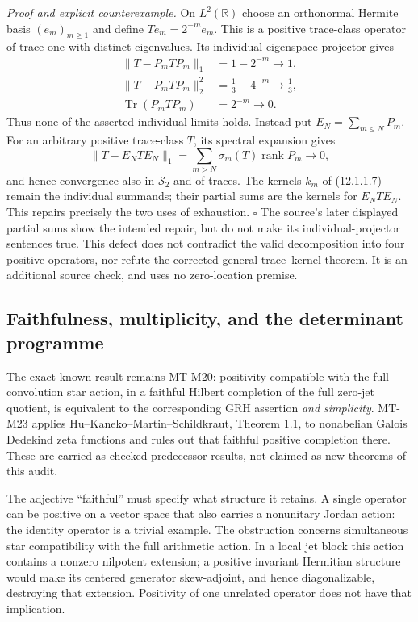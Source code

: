 \emph{Proof and explicit counterexample.}
On $L^2(\mathbb R)$ choose an orthonormal Hermite basis
$(e_m)_{m\ge1}$ and define $Te_m=2^{-m}e_m$.
This is a positive trace-class operator of trace one with
distinct eigenvalues. Its individual eigenspace projector gives
\[
 \begin{aligned}
 \|T-P_mTP_m\|_1&=1-2^{-m}\longrightarrow1,\\
 \|T-P_mTP_m\|_2^2&=\tfrac13-4^{-m}\longrightarrow\tfrac13,\\
 \operatorname{Tr}(P_mTP_m)&=2^{-m}\longrightarrow0.
 \end{aligned}
\]
Thus none of the asserted individual limits holds.
Instead put $E_N=\sum_{m\le N}P_m$. For an arbitrary positive
trace-class $T$, its spectral expansion gives
\[
 \|T-E_NTE_N\|_1
   =\sum_{m>N}\sigma_m(T)\operatorname{rank}P_m\longrightarrow0,
\]
and hence convergence also in $\mathcal S_2$ and of traces.
The kernels $k_m$ of (12.1.1.7) remain the individual summands;
their partial sums are the kernels for $E_NTE_N$.
This repairs precisely the two uses of exhaustion.
\hfill$\square$
The source's later displayed partial sums show the intended
repair, but do not make its individual-projector sentences true.
This defect does not contradict the valid decomposition into
four positive operators, nor refute the corrected general
trace--kernel theorem. It is an additional source check, and
uses no zero-location premise.

\subsection{Faithfulness, multiplicity, and the determinant programme}

The exact known result remains MT-M20: positivity compatible with
the full convolution star action, in a faithful Hilbert completion
of the full zero-jet quotient, is equivalent to the corresponding
GRH assertion \emph{and simplicity}. MT-M23 applies
Hu--Kaneko--Martin--Schildkraut, Theorem 1.1, to nonabelian Galois
Dedekind zeta functions and rules out that faithful positive
completion there. These are carried as checked predecessor
results, not claimed as new theorems of this audit.

The adjective ``faithful'' must specify what structure it retains.
A single operator can be positive on a vector space that also
carries a nonunitary Jordan action: the identity operator is a
trivial example. The obstruction concerns simultaneous star
compatibility with the full arithmetic action. In a local jet
block this action contains a nonzero nilpotent extension; a
positive invariant Hermitian structure would make its centered
generator skew-adjoint, and hence diagonalizable, destroying
that extension. Positivity of one unrelated operator does not
have that implication.


